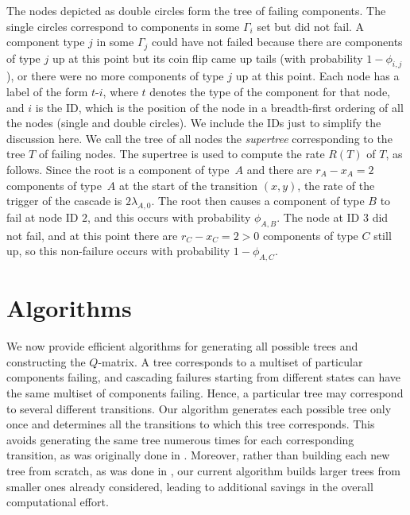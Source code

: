 \documentclass[12pt]{article}
\begin{document}
The nodes depicted as double circles
form the tree of failing components.
The single circles correspond to
components in some $\Gamma_i$ set
but did not fail.  A component type
$j$ in some $\Gamma_j$ could have
not failed because there are
components of type $j$ up at this
point but its coin flip
came up tails 
(with probability $1 - \phi_{i, j}$),
or there were no more components of
type $j$ up at this point.
Each node has a label of the form
$t$-$i$, where $t$ denotes the
type of the component for that node,
and $i$ is the ID, which
is the position of the node
in a breadth-first ordering of
all the nodes (single and double circles).
We include the IDs just to simplify
the discussion here.
We call the tree of all nodes
the \textit{supertree} corresponding
to the tree $T$ of failing nodes.
The supertree is used to compute
the rate $R(T)$ of $T$, as follows.
Since the root is a component of
type~$A$ and there are
$r_A - x_A = 2$ components of type~$A$
at the start of the transition $(x, y)$,
the rate of the trigger of the cascade
is $2 \lambda_{A, 0}$.
The root then causes a component
of type $B$ to fail at node ID $2$,
and this occurs with probability
$\phi_{A,B}$.
The node at ID $3$ did not fail,
and at this point there are
$r_C - x_C = 2 > 0$ components of type $C$
still up, so this non-failure occurs
with probability $1 - \phi_{A,C}$.

\section{Algorithms}
\label{sec:alg}

We now provide efficient algorithms for generating all possible trees and constructing the $Q$-matrix. A tree corresponds to a multiset of particular components failing, and cascading failures starting from different states can have the same multiset of components failing. Hence, a particular tree may correspond to several different transitions. Our algorithm generates each possible tree only once and determines all the transitions to which this tree corresponds. This avoids generating the same tree numerous times for each corresponding transition, as was originally done in \cite{ING:2009}. Moreover, rather than building each new tree from scratch, as was done in \cite{ING:2009}, our current algorithm builds larger trees from smaller ones already considered, leading to additional savings in the overall computational effort.
\end{document}

